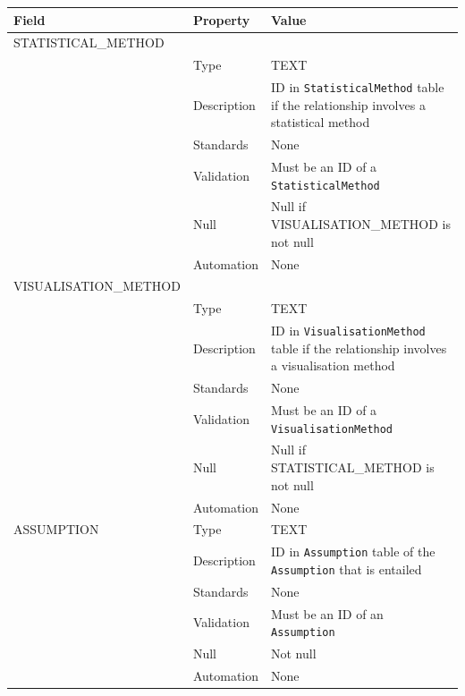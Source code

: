 \documentclass[
]{article}
\newcounter{none}
\begin{document}
{\def\LTcaptype{none} 
\begin{longtable}[]{@{}
  >{\raggedright\arraybackslash}p{}
  >{\raggedright\arraybackslash}p{}
  >{\raggedright\arraybackslash}p{}@{}}
\toprule\noalign{}
\begin{minipage}[b]{\linewidth}\raggedright
Field
\end{minipage} & \begin{minipage}[b]{\linewidth}\raggedright
Property
\end{minipage} & \begin{minipage}[b]{\linewidth}\raggedright
Value
\end{minipage} \\
\midrule\noalign{}
\endhead
\bottomrule\noalign{}
\endlastfoot
STATISTICAL\_METHOD & & \\
& Type & TEXT \\
& Description & ID in \texttt{StatisticalMethod} table if the
relationship involves a statistical method \\
& Standards & None \\
& Validation & Must be an ID of a \texttt{StatisticalMethod} \\
& Null & Null if VISUALISATION\_METHOD is not null \\
& Automation & None \\
VISUALISATION\_METHOD & & \\
& Type & TEXT \\
& Description & ID in \texttt{VisualisationMethod} table if the
relationship involves a visualisation method \\
& Standards & None \\
& Validation & Must be an ID of a \texttt{VisualisationMethod} \\
& Null & Null if STATISTICAL\_METHOD is not null \\
& Automation & None \\
ASSUMPTION & Type & TEXT \\
& Description & ID in \texttt{Assumption} table of the
\texttt{Assumption} that is entailed \\
& Standards & None \\
& Validation & Must be an ID of an \texttt{Assumption} \\
& Null & Not null \\
& Automation & None \\
\end{longtable}
}
\end{document}

